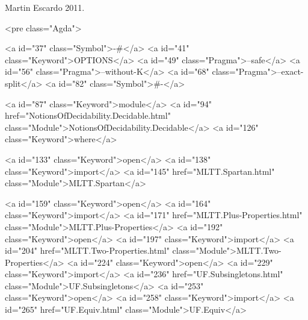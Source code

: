 Martin Escardo 2011.

<pre class="Agda">

<a id="37" class="Symbol">{-#</a> <a id="41" class="Keyword">OPTIONS</a> <a id="49" class="Pragma">--safe</a> <a id="56" class="Pragma">--without-K</a> <a id="68" class="Pragma">--exact-split</a> <a id="82" class="Symbol">#-}</a>

<a id="87" class="Keyword">module</a> <a id="94" href="NotionsOfDecidability.Decidable.html" class="Module">NotionsOfDecidability.Decidable</a> <a id="126" class="Keyword">where</a>

<a id="133" class="Keyword">open</a> <a id="138" class="Keyword">import</a> <a id="145" href="MLTT.Spartan.html" class="Module">MLTT.Spartan</a>

<a id="159" class="Keyword">open</a> <a id="164" class="Keyword">import</a> <a id="171" href="MLTT.Plus-Properties.html" class="Module">MLTT.Plus-Properties</a>
<a id="192" class="Keyword">open</a> <a id="197" class="Keyword">import</a> <a id="204" href="MLTT.Two-Properties.html" class="Module">MLTT.Two-Properties</a>
<a id="224" class="Keyword">open</a> <a id="229" class="Keyword">import</a> <a id="236" href="UF.Subsingletons.html" class="Module">UF.Subsingletons</a>
<a id="253" class="Keyword">open</a> <a id="258" class="Keyword">import</a> <a id="265" href="UF.Equiv.html" class="Module">UF.Equiv</a>

